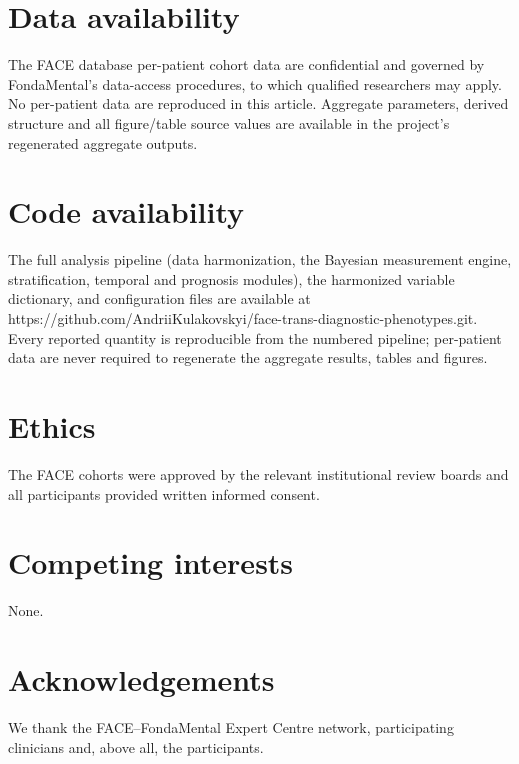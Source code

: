 
\section*{Data availability}
The FACE database per-patient cohort data
are confidential and governed by FondaMental's data-access procedures, to which
qualified researchers may apply. No per-patient data are reproduced in this article.
Aggregate parameters, derived structure and all figure/table source values are
available in the project's regenerated aggregate outputs.

\section*{Code availability}
The full analysis pipeline (data harmonization, the Bayesian measurement engine,
stratification, temporal and prognosis modules), the harmonized variable
dictionary, and configuration files are available at https://github.com/AndriiKulakovskyi/face-trans-diagnostic-phenotypes.git.
Every reported quantity is reproducible from the numbered pipeline; per-patient data
are never required to regenerate the aggregate results, tables and figures.

\section*{Ethics}
The FACE cohorts were approved by the relevant institutional review boards and all
participants provided written informed consent. 

\section*{Competing interests}
None.

\section*{Acknowledgements}
We thank the FACE--FondaMental Expert Centre network, participating clinicians and,
above all, the participants. 

